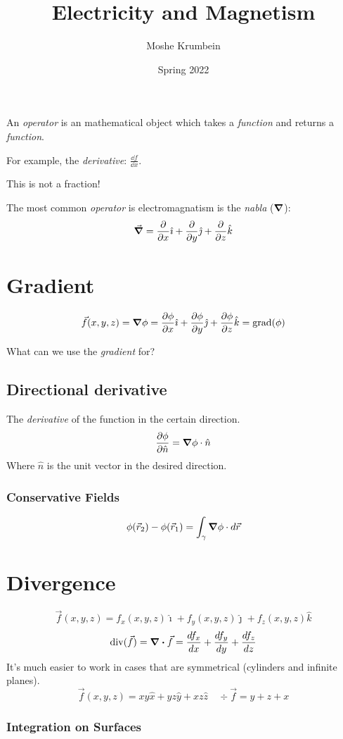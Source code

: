 \documentclass[00_complete]{subfiles}
\title{Electricity and Magnetism}
\author{Moshe Krumbein}
\date{Spring 2022}
\begin{document}

\begin{definition}[Operator]
An \emph{operator} is an mathematical object which takes a \emph{function} and
returns a \emph{function}.

For example, the \emph{derivative}: $\frac{\dd{f}}{\dd{x}}$.
\begin{note}
    This is not a fraction!
\end{note}
\end{definition}
The most common \emph{operator} is electromagnatism is the \emph{nabla}
($\grad$):
$$\vec \grad =\frac{\partial}{\partial x} \hat \imath + \frac{\partial}{\partial
y} \hat \jmath + \frac{\partial}{\partial z} \hat k$$
\section{Gradient}

$$\vec f(x,y,z)= \grad \phi = \pdv{\phi}{x}\hat \imath + \pdv{\phi}{y}\hat
\jmath + \pdv{\phi}{z} \hat k = \operatorname{grad}(\phi)$$

What can we use the \emph{gradient} for?

\subsection{Directional derivative}
The \emph{derivative} of the function in the certain direction.
$$\pdv{\phi}{\hat n}=\grad \phi \cdot \hat n$$
Where $\hat n$ is the unit vector in the desired direction.
\subsubsection{Conservative Fields}
$$\phi(\vec r_2)-\phi(\vec r_1)=\int_\gamma \grad \phi \cdot \dd{\vec r}$$

\section{Divergence}
$$\vec f(x,y,z)=f_x(x,y,z)\hat \imath + f_y(x,y,z)\hat \jmath+f_z(x,y,z)\hat k$$
$$\operatorname{div}(\vec f)= \div \vec f =
\frac{\dd{f_x}}{\dd{x}}+\frac{\dd{f_y}}{\dd{y}}+\frac{\dd{f_z}}{\dd{z}}$$
It's much easier to work in cases that are symmetrical (cylinders and infinite
planes).
$$\vec f(x,y,z)=xy\hat x + yz\hat y + xz\hat z \quad \div \vec f = y+z+x$$
\subsubsection{Integration on Surfaces}
\end{document}
